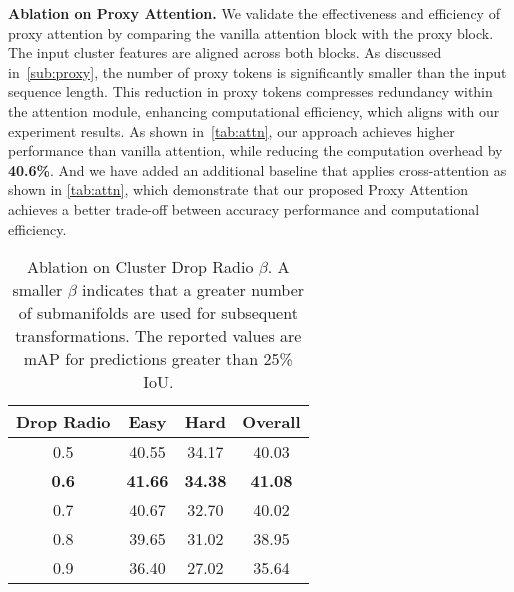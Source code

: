 \noindent \textbf{Ablation on Proxy Attention.}
We validate the effectiveness and efficiency of proxy attention by comparing the vanilla attention block with the proxy block. The input cluster features are aligned across both blocks. As discussed in~\cref{sub:proxy}, the number of proxy tokens is significantly smaller than the input sequence length. This reduction in proxy tokens compresses redundancy within the attention module, enhancing computational efficiency, which aligns with our experiment results. As shown in~\cref{tab:attn}, our approach achieves higher performance than vanilla attention, while reducing the computation overhead by \textbf{40.6\%}. And we have added an additional baseline that applies cross-attention as shown in \cref{tab:attn}, which demonstrate that our proposed Proxy Attention achieves a better trade-off between accuracy performance and computational efficiency.


\begin{table}
    \centering
    \begin{tabular}{c |c c |c}
    \toprule
    Drop Radio & Easy &  Hard& Overall\\
    \midrule
     0.5 & 40.55 & 34.17 & 40.03 \\
     \textbf{0.6} & \textbf{41.66} & \textbf{34.38} & \textbf{41.08} \\
     0.7 & 40.67 & 32.70 & 40.02 \\
     0.8 & 39.65 & 31.02 & 38.95 \\
     0.9 & 36.40 & 27.02 & 35.64 \\
    \bottomrule
    \end{tabular}
    \caption{Ablation on Cluster Drop Radio $\beta$. A smaller \( \beta \) indicates that a greater number of submanifolds are used for subsequent transformations. The reported values are mAP for predictions greater than 25\% IoU.}
    \label{tab:drop radio}
\end{table}

